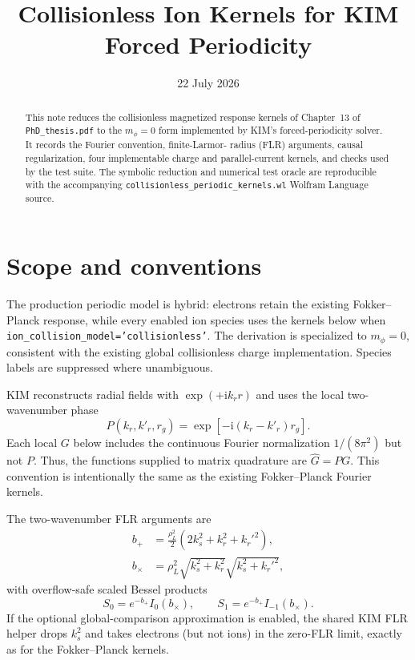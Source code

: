 \documentclass[11pt]{article}
\title{Collisionless Ion Kernels for KIM Forced Periodicity}
\author{}
\date{22 July 2026}
\newcommand{\ii}{\mathrm{i}}
\begin{document}
\maketitle

\begin{abstract}
This note reduces the collisionless magnetized response kernels of Chapter~13
of \texttt{PhD\_thesis.pdf} to the $m_\phi=0$ form implemented by KIM's
forced-periodicity solver.  It records the Fourier convention, finite-Larmor-
radius (FLR) arguments, causal regularization, four implementable charge and
parallel-current kernels, and checks used by the test suite.  The symbolic
reduction and numerical test oracle are reproducible with the accompanying
\texttt{collisionless\_periodic\_kernels.wl} Wolfram Language source.
\end{abstract}

\section{Scope and conventions}

The production periodic model is hybrid: electrons retain the existing
Fokker--Planck response, while every enabled ion species uses the kernels below
when \texttt{ion\_collision\_model=}\allowbreak\texttt{'collisionless'}.
The derivation is
specialized to $m_\phi=0$, consistent with the existing global collisionless
charge implementation.  Species labels are suppressed where unambiguous.

KIM reconstructs radial fields with $\exp(+\ii k_r r)$ and uses the local
two-wavenumber phase
\begin{equation}
  P(k_r,k'_r,r_g)=\exp[-\ii(k_r-k'_r)r_g].
\end{equation}
Each local $G$ below includes the continuous Fourier normalization
$1/(8\pi^2)$ but not $P$.  Thus, the functions supplied to matrix quadrature
are $\widehat G=P G$.  This convention is intentionally the same as the
existing Fokker--Planck Fourier kernels.

The two-wavenumber FLR arguments are
\begin{align}
 b_+ &= \frac{\rho_L^2}{2}\left(2k_s^2+k_r^2+k_r'^2\right),\\
 b_\times &= \rho_L^2\sqrt{k_s^2+k_r^2}\sqrt{k_s^2+k_r'^2},
\end{align}
with overflow-safe scaled Bessel products
\begin{equation}
 S_0=e^{-b_+}I_0(b_\times),\qquad
 S_1=e^{-b_+}I_{-1}(b_\times).
\end{equation}
If the optional global-comparison approximation is enabled, the shared KIM
FLR helper drops $k_s^2$ and takes electrons (but not ions) in the zero-FLR
limit, exactly as for the Fokker--Planck kernels.
\end{document}
